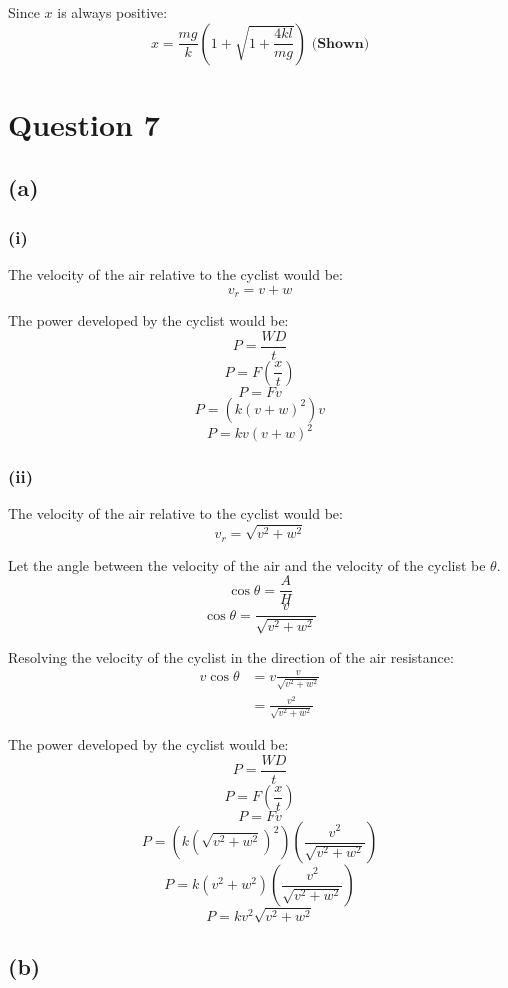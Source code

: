 \documentclass[11pt]{article}
\begin{document}
Since \(x\) is always positive:
\[x = \frac{mg}{k} \left(1 + \sqrt{1 + \frac{4kl}{mg}} \right) \textbf{ (Shown)}\]


\section{Question 7}
\label{sec:orga8a6725}

\subsection{(a)}
\label{sec:orga796a7e}

\subsubsection{(i)}
\label{sec:orgf1698a3}
The velocity of the air relative to the cyclist would be:
\[v_r = v + w\]

The power developed by the cyclist would be:
\[P = \frac{WD}{t}\]
\[P = F \left(\frac{x}{t} \right)\]
\[P = Fv\]
\[P = (k(v + w)^2)v\]
\[P = kv(v + w)^2\]

\newpage

\subsubsection{(ii)}
\label{sec:org6c4cf57}
The velocity of the air relative to the cyclist would be:
\[v_r = \sqrt{v^2 + w^2}\]

Let the angle between the velocity of the air and the velocity of the cyclist be \(\theta\).
\[\cos \theta = \frac{A}{H}\]
\[\cos \theta = \frac{v}{\sqrt{v^2 + w^2}}\]

Resolving the velocity of the cyclist in the direction of the air resistance:
\begin{align*}
v \cos \theta &= v \frac{v}{\sqrt{v^2 + w^2}} \\
&= \frac{v^2}{\sqrt{v^2 + w^2}}
\end{align*}

The power developed by the cyclist would be:
\[P = \frac{WD}{t}\]
\[P = F \left(\frac{x}{t} \right)\]
\[P = Fv\]
\[P = (k(\sqrt{v^2 + w^2})^2) \left( \frac{v^2}{\sqrt{v^2 + w^2}} \right)\]
\[P = k(v^2 + w^2) \left( \frac{v^2}{\sqrt{v^2 + w^2}} \right)\]
\[P = kv^2\sqrt{v^2 + w^2}\]

\newpage

\subsection{(b)}
\label{sec:orgc5ae03d}
\end{document}

